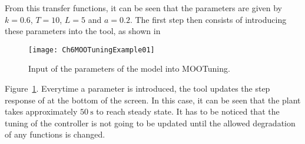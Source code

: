 From this transfer functions, it can be seen that the parameters are given by $k=0.6$, $T=10$, $L=5$ and $a = 0.2$. The first step then consists of introducing these parameters into the tool, as shown in %
\begin{figure}[tb]
	\centering
	\texttt{[image: Ch6MOOTuningExample01]}
	\caption{Input of the parameters of the model into MOOTuning.}
	\label{fig:Ch6MOOTuningExample01}
\end{figure}
%
Figure~\ref{fig:Ch6MOOTuningExample01}. Everytime a parameter is introduced, the tool updates the step response of at the bottom of the screen. In this case, it can be seen that the plant takes approximately $\SI{50}{\second}$ to reach steady state. It has to be noticed that the tuning of the controller is not going to be updated until the allowed degradation of any functions is changed.

